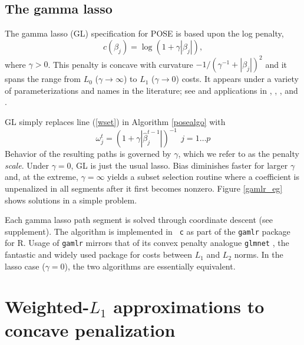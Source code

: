 \documentclass[12pt]{article}
\begin{document}
\subsection{The gamma lasso}
\label{sec:gamlr}

The gamma lasso (GL) specification for POSE is based upon the log penalty,
\begin{equation}\label{logpen}
c(\beta_j) =  \log(1+\gamma|\beta_j|),
\end{equation} where $\gamma > 0$.  This
penalty is concave with curvature $-1/(\gamma^{-1}+|\beta_j|)^2$ and it spans the
range from $L_0$ ($\gamma\rightarrow \infty$) to $L_1$ ($\gamma\rightarrow 0$)
costs.  It appears under a variety of parameterizations and names in the
literature; see
\citet{mazumder_sparsenet_2011} and applications in
\citet{friedman_fast_2008}, \citet{candes_enhancing_2008},
\citet{cevher_learning_2009}, \citet{taddy_multinomial_2013} and \citet{armagan_generalized_2013}. 

GL simply replaces line (\ref{wset}) in Algorithm \ref{posealgo}  with
\begin{equation}\label{gammalasso}
\omega^{t}_j  = \left(1 + \gamma |\hat\beta^{t-1}_j|\right)^{-1} ~~j=1\ldots p 
\end{equation}
Behavior of the resulting paths  is governed by $\gamma$, which we refer to as the
penalty {\it scale}.  Under $\gamma=0$, GL is just the usual lasso.
 Bias diminishes faster for larger $\gamma$ and, at the  extreme,
$\gamma=\infty$ yields a subset selection routine where a coefficient is
unpenalized in all segments after it first becomes nonzero. Figure
\ref{gamlr_eg} shows solutions in a simple problem.


Each  gamma lasso path segment is solved through coordinate descent (see supplement).  The algorithm is implemented in {\tt
c} as part of the {\tt gamlr} package for {\sf R}. 
Usage of {\tt gamlr} mirrors that of its
convex penalty analogue {\tt glmnet} \citep{friedman_regularization_2010}, the
fantastic and widely used package for costs between $L_1$ and $L_2$ norms. In
the lasso case ($\gamma=0$), the two algorithms are essentially equivalent.


\section{Weighted-$L_1$ approximations to concave penalization}
\label{sec:weighted}
\end{document}
